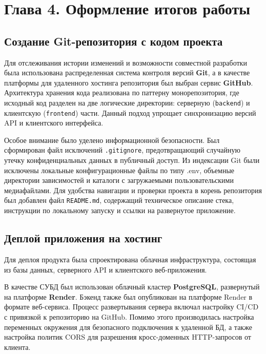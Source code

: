 
\section*{Глава 4. Оформление итогов работы}

\subsection{Создание Git-репозитория с кодом проекта}

Для отслеживания истории изменений и возможности совместной разработки была использована распределенная система контроля версий \textbf{Git}, а в качестве 
платформы для удаленного хостинга репозитория был выбран сервис \textbf{GitHub}. Архитектура хранения кода реализована по паттерну 
монорепозитория, где исходный код разделен на две логические директории: серверную (\texttt{backend}) и 
клиентскую (\texttt{frontend}) части. Данный подход упрощает синхронизацию версий API и клиентского интерфейса.

Особое внимание было уделено информационной безопасности. Был сформирован файл исключений \texttt{.gitignore}, предотвращающий случайную утечку конфиденциальных 
данных в публичный доступ. Из индексации Git были исключены локальные конфигурационные файлы по типу .env, объемные директории зависимостей и каталоги с загружаемыми 
пользовательскими медиафайлами. Для удобства навигации и проверки проекта в корень репозитория был добавлен файл \texttt{README.md}, содержащий техническое описание 
стека, инструкции по локальному запуску и ссылки на развернутое приложение.

\subsection{Деплой приложения на хостинг}

Для деплоя продукта была спроектирована облачная инфраструктура, состоящая из базы данных, серверного API и клиентского веб-приложения.

В качестве СУБД был использован облачный кластер \textbf{PostgreSQL}, развернутый на платформе \textbf{Render}. Бэкенд также был опубликован на платформе Render в формате веб-сервиса. 
Процесс развертывания сервера включал настройку CI/CD с привязкой к репозиторию на GitHub. Помимо этого производилась настройка переменных окружения для безопасного 
подключения к удаленной БД, а также настройка политик CORS для разрешения кросс-доменных HTTP-запросов от клиента.

